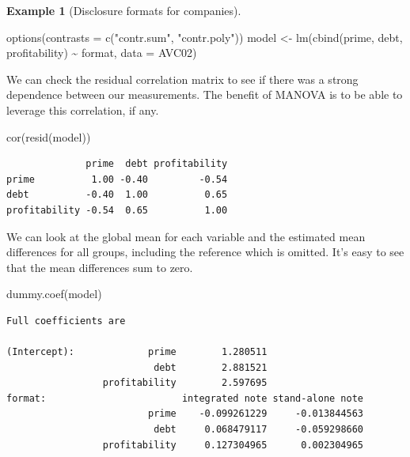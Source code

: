 \documentclass[
  11pt,
  letterpaper,
]{scrbook}
\newenvironment{Shaded}{\begin{snugshade}}{\end{snugshade}}
\newcommand{\AttributeTok}[1]{\textcolor[rgb]{0.40,0.45,0.13}{#1}}
\newcommand{\FunctionTok}[1]{\textcolor[rgb]{0.28,0.35,0.67}{#1}}
\newcommand{\NormalTok}[1]{\textcolor[rgb]{0.00,0.23,0.31}{#1}}
\newcommand{\OtherTok}[1]{\textcolor[rgb]{0.00,0.23,0.31}{#1}}
\newcommand{\SpecialCharTok}[1]{\textcolor[rgb]{0.37,0.37,0.37}{#1}}
\newcommand{\StringTok}[1]{\textcolor[rgb]{0.13,0.47,0.30}{#1}}
\theoremstyle{definition}
\newtheorem{example}{Example}[chapter]
\theoremstyle{definition}
\theoremstyle{remark}
\begin{document}
\begin{example}[Disclosure formats for
companies]
\begin{Shaded}
\begin{Highlighting}[]
\FunctionTok{options}\NormalTok{(}\AttributeTok{contrasts =} \FunctionTok{c}\NormalTok{(}\StringTok{"contr.sum"}\NormalTok{, }\StringTok{"contr.poly"}\NormalTok{))}
\NormalTok{model }\OtherTok{\textless{}{-}} \FunctionTok{lm}\NormalTok{(}\FunctionTok{cbind}\NormalTok{(prime, debt, profitability) }\SpecialCharTok{\textasciitilde{}}\NormalTok{ format, }
            \AttributeTok{data =}\NormalTok{ AVC02)}
\end{Highlighting}
\end{Shaded}

We can check the residual correlation matrix to see if there was a
strong dependence between our measurements. The benefit of MANOVA is to
be able to leverage this correlation, if any.

\begin{Shaded}
\begin{Highlighting}[]
\FunctionTok{cor}\NormalTok{(}\FunctionTok{resid}\NormalTok{(model))}
\end{Highlighting}
\end{Shaded}

\begin{verbatim}
              prime  debt profitability
prime          1.00 -0.40         -0.54
debt          -0.40  1.00          0.65
profitability -0.54  0.65          1.00
\end{verbatim}

We can look at the global mean for each variable and the estimated mean
differences for all groups, including the reference which is omitted.
It's easy to see that the mean differences sum to zero.

\begin{Shaded}
\begin{Highlighting}[]
\FunctionTok{dummy.coef}\NormalTok{(model)}
\end{Highlighting}
\end{Shaded}

\begin{verbatim}
Full coefficients are 
                                                               
(Intercept):             prime        1.280511                 
                          debt        2.881521                 
                 profitability        2.597695                 
format:                        integrated note stand-alone note
                         prime    -0.099261229     -0.013844563
                          debt     0.068479117     -0.059298660
                 profitability     0.127304965      0.002304965
                                       

\end{verbatim}
\end{example}
\end{document}
